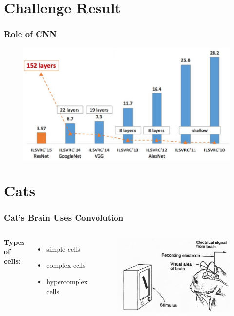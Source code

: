 \documentclass{beamer}
\begin{document}
\section{Challenge Result}
\begin{frame}
\frametitle{Role of CNN}
\begin{figure}
	\includegraphics[width=\linewidth]{Pics/imagenet_acc.png}
\end{figure}
\end{frame}

\section{Cats}
\begin{frame}
\frametitle{Cat's Brain Uses Convolution}
\begin{columns}[c] %
	
	\textbf{Types of cells:}
\begin{itemize}
	\item simple cells
	\item complex cells
	\item hypercomplex cells
\end{itemize}

\begin{figure}
	\includegraphics[width=\linewidth]{Pics/cats.jpg}
\end{figure}
\end{columns}
\end{frame}
\end{document}
